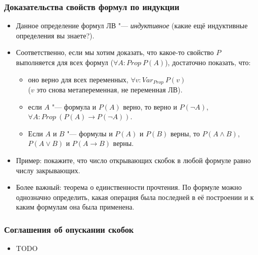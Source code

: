 \documentclass[10pt]{beamer}
\begin{document}
\begin{frame}
    \frametitle{Доказательства свойств формул по индукции}
    \begin{itemize}
        \item Данное определение формул ЛВ "--- \emph{индуктивное} (какие ещё индуктивные определения вы знаете?).
        \item Соответственно, если мы хотим доказать, что какое-то свойство $P$ выполняется для всех формул ($\forall A : Prop ~ P(A)$), достаточно показать, что:
        \pause
        \begin{itemize}
            \item оно верно для всех переменных, $\forall v : Var_{Prop} ~ P(v)$ \\($v$ это снова метапеременная, не переменная ЛВ).
            \item если $A$ "--- формула и $P(A)$ верно, то верно и $P(\neg A)$, $\forall A : Prop ~ (P(A) \to P(\neg A))$.
            \item Если $A$ и $B$ "--- формулы и $P(A)$ и $P(B)$ верны, то $P(A \land B)$, $P(A \lor B)$ и $P(A \to B)$ верны.
        \end{itemize}
        \pause
        \item Пример: покажите, что число открывающих скобок в любой формуле равно числу закрывающих.
        \pause
        \item Более важный: теорема о единственности прочтения. По формуле можно однозначно определить, какая операция была последней в её построении и к каким формулам она была применена.
    \end{itemize}
\end{frame}

\begin{frame}
    \frametitle{Соглашения об опускании скобок}
    \begin{itemize}
        \item TODO
    \end{itemize}
\end{frame}
\end{document}
